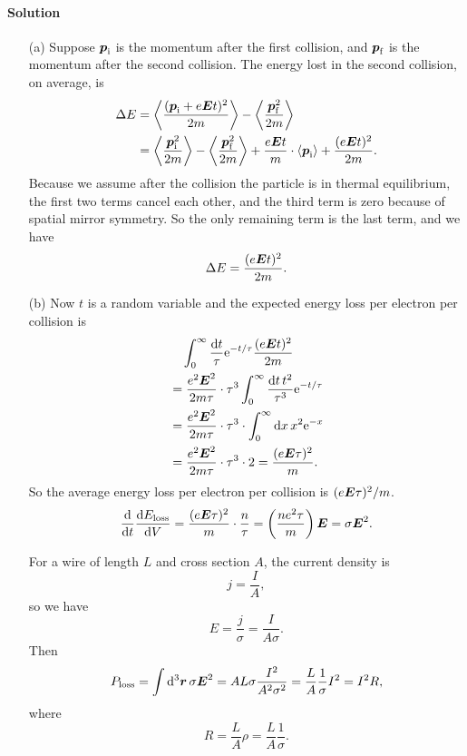 \documentclass[hyperref, a4paper]{article}
\newcommand*{\ee}{\mathrm{e}}
\begin{document}
\paragraph{Solution} \begin{itemize}
\item[(a)] Suppose $\vb*{p}_{\text{i}}$ is the momentum after the first collision,
and $\vb*{p}_{\text{f}}$ is the momentum after the second collision.
The energy lost in the second collision, on average, is 
\[
    \begin{aligned}
        \Delta E &= \expval{\frac{(\vb*{p}_{\text{i}} + e \vb*{E} t)^2}{2m}} 
        - \expval{\frac{\vb*{p}_{\text{f}}^2}{2m}} \\
        &= \expval{\frac{\vb*{p}_{\text{i}}^2}{2m}} - \expval{\frac{\vb*{p}_{\text{f}}^2}{2m}}
        + \frac{e \vb*{E} t}{m} \cdot \expval{\vb*{p}_{\text{i}}} 
        + \frac{(e \vb*{E} t)^2}{2m}.
    \end{aligned}
\]
Because we assume after the collision the particle is in thermal equilibrium,
the first two terms cancel each other,
and the third term is zero because of spatial mirror symmetry.
So the only remaining term is the last term, and we have 
\begin{equation}
    \Delta E = \frac{(e \vb*{E} t)^2}{2m}.
\end{equation}

\item[(b)] Now $t$ is a random variable and the expected energy loss per electron per collision is 
\[
    \begin{aligned}
        &\quad \int_{0}^\infty \frac{\dd{t}}{\tau} \ee^{- t / \tau} 
        \frac{(e \vb*{E} t)^2}{2m} \\
        &= \frac{e^2 \vb*{E}^2}{2m \tau} \cdot \tau^3 \int_{0}^\infty \frac{\dd{t} t^2}{\tau^3} \ee^{- t / \tau} \\
        &= \frac{e^2 \vb*{E}^2}{2m \tau} \cdot \tau^3 \cdot \int_{0}^\infty \dd{x} x^2 \ee^{-x} \\
        &= \frac{e^2 \vb*{E}^2}{2m \tau} \cdot \tau^3 \cdot 2 = \frac{(e \vb*{E} \tau)^2}{m}.
    \end{aligned} 
\]
So the average energy loss per electron per collision is $(e \vb*{E} \tau)^2 / m$.
\begin{equation}
    \dv{t} \dv{E_{\text{loss}}}{V} = \frac{(e \vb*{E} \tau)^2}{m} \cdot \frac{n}{\tau} 
    = \left( \frac{n e^2 \tau}{m} \right) \vb*{E} = \sigma \vb*{E}^2.
\end{equation}

For a wire of length $L$ and cross section $A$, the current density is 
\[
    j = \frac{I}{A},
\]
so we have 
\[
    E = \frac{j}{\sigma} = \frac{I}{A \sigma}.
\]
Then 
\begin{equation}
    P_{\text{loss}} = \int \dd[3]{\vb*{r}} \sigma \vb*{E}^2 
    = AL \sigma \frac{I^2}{A^2 \sigma^2} = \frac{L}{A} \frac{1}{\sigma} I^2 = I^2 R,
\end{equation}
where 
\[
    R = \frac{L}{A} \rho = \frac{L}{A} \frac{1}{\sigma}.
\]

\end{itemize}
\end{document}
